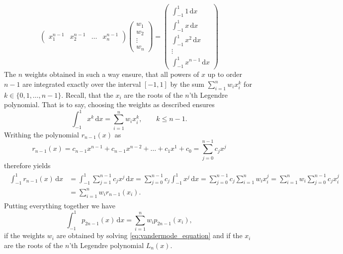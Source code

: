 \documentclass[a4paper,11pt]{article}
\numberwithin{equation}{section}
\begin{document}
{\begin{equation}
\begin{pmatrix}
	x_1^{n-1} & x_2^{n-1} & \dots & x_n^{n-1}
\end{pmatrix}\begin{pmatrix}
w_1 \\ w_2 \\ \vdots \\ w_n
\end{pmatrix} = \begin{pmatrix}
\int_{-1}^{1} 1 \,\mathrm{d}x \\
\int_{-1}^{1} x \,\mathrm{d}x \\
\int_{-1}^{1} x^2 \,\mathrm{d}x \\
\vdots \\
\int_{-1}^{1} x^{n-1} \,\mathrm{d}x
\end{pmatrix}
\end{equation} The $n$ weights obtained in such a way ensure, that all powers of $x$ up to order $n-1$ are integrated exactly over the interval $[-1,1]$ by the sum $\sum_{i=1}^n w_i x_i^{k}$ for $k \in \{0, 1, \dots, n-1\}$. Recall, that the $x_i$ are the roots of the $n$'th Legendre polynomial. That is to say, choosing the weights as described ensures \begin{equation}
\int_{-1}^{1} x^k\,\mathrm{d}x = \sum_{i=1}^n w_i x_i^k, \qquad k \leq n-1.
\end{equation} Writhing the polynomial $r_{n-1}(x)$ as \begin{equation}
r_{n-1}(x) = c_{n-1} x^{n-1} + c_{n-1} x^{n-2} + \dots + c_{1}x^1 + c_0 = \sum_{j=0}^{n-1} c_j x^j
\end{equation} therefore yields \begin{align}
\begin{aligned}
	\int_{-1}^{1}r_{n-1}(x)\,\mathrm{d}x &= \int_{-1}^{1}\sum_{j=1}^{n-1}c_jx^j\,\mathrm{d}x = \sum_{j=0}^{n-1}c_j\int_{-1}^{1}x^j\,\mathrm{d}x = \sum_{j=0}^{n-1}c_j\sum_{i=1}^{n}w_ix_i^j = \sum_{i=1}^{n}w_i\sum_{j=0}^{n-1}c_jx_i^j  \\ &= \sum_{i=1}^{n}w_i r_{n-1}(x_i).
\end{aligned}
\end{align} Putting everything together we have \begin{equation}
\int_{-1}^1 p_{2n-1}(x)\,\mathrm{d}x = \sum_{i=1}^{n}w_ip_{2n-1}(x_i),
\end{equation} if the weights $w_i$ are obtained by solving \cref{eq:vandermode_equation} and if the $x_i$ are the roots of the $n$'th Legendre polynomial $L_n(x)$.

}
\end{document}
